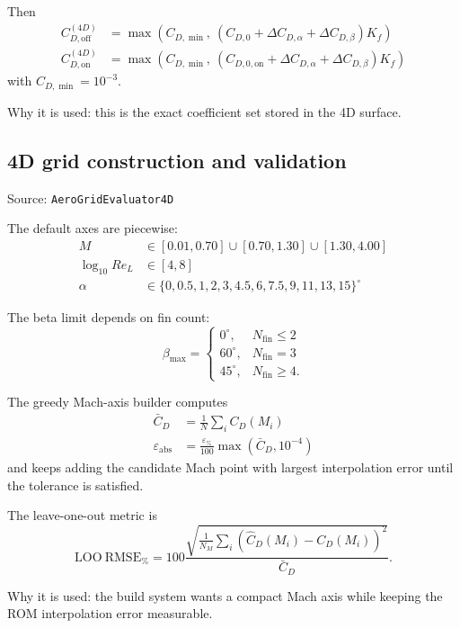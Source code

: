 \documentclass[11pt]{article}
\begin{document}
Then
\begin{align*}
C_{D,\mathrm{off}}^{(4D)} &= \max\!\left(C_{D,\min},\ (C_{D,0} + \Delta C_{D,\alpha} + \Delta C_{D,\beta})K_f\right) \\
C_{D,\mathrm{on}}^{(4D)} &= \max\!\left(C_{D,\min},\ (C_{D,0,\mathrm{on}} + \Delta C_{D,\alpha} + \Delta C_{D,\beta})K_f\right)
\end{align*}
with $C_{D,\min}=10^{-3}$.

Why it is used: this is the exact coefficient set stored in the 4D surface.

\subsection{4D grid construction and validation}
Source: \texttt{AeroGridEvaluator4D}

The default axes are piecewise:
\begin{align*}
M &\in [0.01,0.70] \cup [0.70,1.30] \cup [1.30,4.00] \\
\log_{10}Re_L &\in [4,8] \\
\alpha &\in \{0,0.5,1,2,3,4.5,6,7.5,9,11,13,15\}^{\circ}
\end{align*}

The beta limit depends on fin count:
\begin{equation*}
\beta_{\max} =
\begin{cases}
0^\circ, & N_{\mathrm{fin}} \le 2 \\
60^\circ, & N_{\mathrm{fin}} = 3 \\
45^\circ, & N_{\mathrm{fin}} \ge 4.
\end{cases}
\end{equation*}

The greedy Mach-axis builder computes
\begin{align*}
\bar C_D &= \frac{1}{N}\sum_i C_D(M_i) \\
\varepsilon_{\mathrm{abs}} &= \frac{\varepsilon_{\%}}{100}\max(\bar C_D,10^{-4})
\end{align*}
and keeps adding the candidate Mach point with largest interpolation error until the tolerance is satisfied.

The leave-one-out metric is
\begin{equation*}
\mathrm{LOO\ RMSE}_{\%} = 100\frac{\sqrt{\frac{1}{N_M}\sum_i \left(\hat C_D(M_i)-C_D(M_i)\right)^2}}{\bar C_D}.
\end{equation*}

Why it is used: the build system wants a compact Mach axis while keeping the ROM interpolation error measurable.
\end{document}
